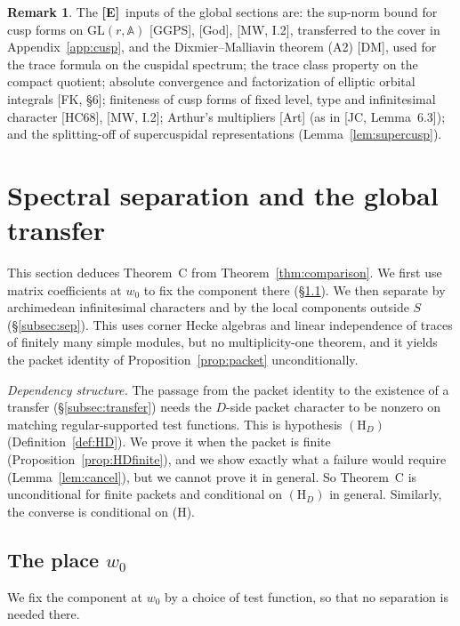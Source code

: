\documentclass[12pt]{article}
\newcommand{\A}{\mathbb{A}}
\newcommand{\GL}{\mathrm{GL}}
\newcommand{\Ev}{\textbf{[E]}}
\theoremstyle{plain}
\theoremstyle{definition}
\newtheorem{remark}[theorem]{Remark}
\begin{document}
\begin{remark}\label{rem:Einputs}
The \Ev\ inputs of the global sections are: the sup-norm bound for cusp forms on $\GL(r,\A)$ [GGPS], [God], [MW, I.2], transferred to the cover in Appendix~\ref{app:cusp}, and the Dixmier--Malliavin theorem (A2) [DM], used for the trace formula on the cuspidal spectrum; the trace class property on the compact quotient; absolute convergence and factorization of elliptic orbital integrals [FK, \S6]; finiteness of cusp forms of fixed level, type and infinitesimal character [HC68], [MW, I.2]; Arthur's multipliers [Art] (as in [JC, Lemma~6.3]); and the splitting-off of supercuspidal representations (Lemma~\ref{lem:supercusp}).
\end{remark}

\section{Spectral separation and the global transfer}\label{sec:spectral}
This section deduces Theorem~C from Theorem~\ref{thm:comparison}. We first use matrix coefficients at $w_0$ to fix the component there (\S\ref{subsec:w0}). We then separate by archimedean infinitesimal characters and by the local components outside $S$ (\S\ref{subsec:sep}). This uses corner Hecke algebras and linear independence of traces of finitely many simple modules, but no multiplicity-one theorem, and it yields the packet identity of Proposition~\ref{prop:packet} unconditionally.

\emph{Dependency structure.} The passage from the packet identity to the existence of a transfer (\S\ref{subsec:transfer}) needs the $D$-side packet character to be nonzero on matching regular-supported test functions. This is hypothesis $(\mathrm H_D)$ (Definition~\ref{def:HD}). We prove it when the packet is finite (Proposition~\ref{prop:HDfinite}), and we show exactly what a failure would require (Lemma~\ref{lem:cancel}), but we cannot prove it in general. So Theorem~C is unconditional for finite packets and conditional on $(\mathrm H_D)$ in general. Similarly, the converse is conditional on (H).

\subsection{The place $w_0$}\label{subsec:w0}
We fix the component at $w_0$ by a choice of test function, so that no separation is needed there.
\end{document}
